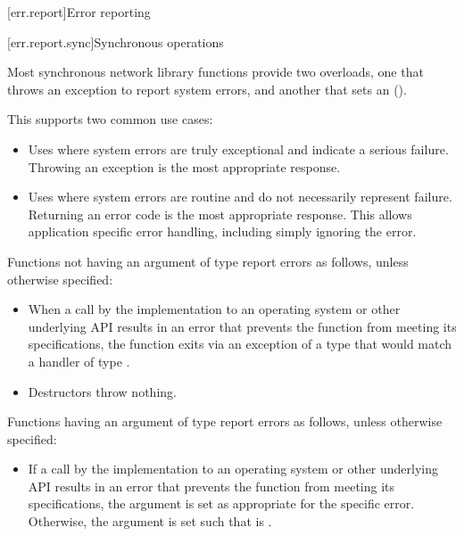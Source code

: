 
[err.report]{Error reporting}


[err.report.sync]{Synchronous operations}

\pnum
Most synchronous network library functions provide two overloads, one that throws an exception to report system errors, and another that sets an  ().

\begin{note} This supports two common use cases:
\begin{itemize}
\item
 Uses where system errors are truly exceptional and indicate a serious failure. Throwing an exception is the most appropriate response.
\item
 Uses where system errors are routine and do not necessarily represent failure. Returning an error code is the most appropriate response. This allows application specific error handling, including simply ignoring the error.
\end{itemize}\end{note}

\pnum
Functions not having an argument of type  report errors as follows, unless otherwise specified:

\begin{itemize}
\item
When a call by the implementation to an operating system or other underlying API results in an error that prevents the function from meeting its specifications, the function exits via an exception of a type that would match a handler of type .

\item
Destructors throw nothing.
\end{itemize}

\pnum
Functions having an argument of type  report errors as follows, unless otherwise specified:

\begin{itemize}
\item
If a call by the implementation to an operating system or other underlying API results in an error that prevents the function from meeting its specifications, the  argument  is set as appropriate for the specific error. Otherwise, the  argument is set such that  is .
\end{itemize}

